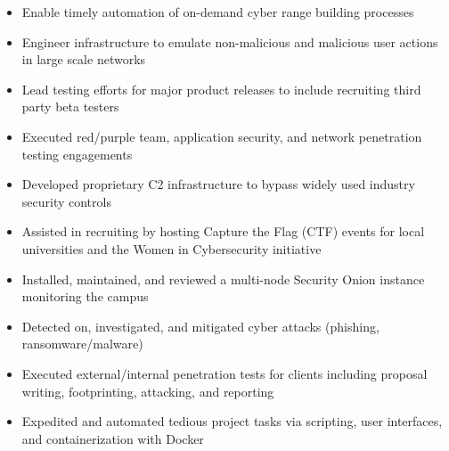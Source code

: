 \documentclass[10pt,usletter,ragged2e,withhyper]{altacv}
\begin{document}
\begin{paracol}{2}


\begin{itemize}
\item Enable timely automation of on-demand cyber range building processes
\item Engineer infrastructure to emulate non-malicious and malicious user actions in large scale networks
\item Lead testing efforts for major product releases to include recruiting third party beta testers
\end{itemize}

\divider

\begin{itemize}
\item Executed red/purple team, application security, and network penetration testing engagements
\item Developed proprietary C2 infrastructure to bypass widely used industry security controls
\item Assisted in recruiting by hosting Capture the Flag (CTF) events for local universities and the Women in Cybersecurity initiative
\end{itemize}

\divider

\begin{itemize}
\item Installed, maintained, and reviewed a multi-node Security Onion instance monitoring the campus
\item Detected on, investigated, and mitigated cyber attacks (phishing, ransomware/malware)
\end{itemize}

\divider

\begin{itemize}
\item Executed external/internal penetration tests for clients including proposal writing, footprinting, attacking, and reporting
\item Expedited and automated tedious project tasks via scripting, user interfaces, and containerization with Docker
\end{itemize}


\end{paracol}
\end{document}
